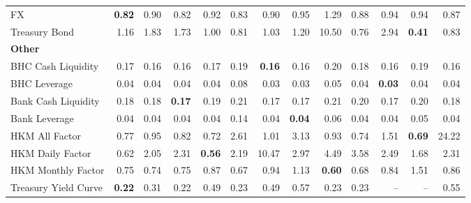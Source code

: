 \begin{tabular}{@{}lrrrrrrrrrrrr@{}}
FX & \textbf{0.82} & 0.90 & 0.82 & 0.92 & 0.83 & 0.90 & 0.95 & 1.29 & 0.88 & 0.94 & 0.94 & 0.87 \\
Treasury Bond & 1.16 & 1.83 & 1.73 & 1.00 & 0.81 & 1.03 & 1.20 & 10.50 & 0.76 & 2.94 & \textbf{0.41} & 0.83 \\
\midrule
\multicolumn{13}{l}{\textbf{Other}} \\
BHC Cash Liquidity & 0.17 & 0.16 & 0.16 & 0.17 & 0.19 & \textbf{0.16} & 0.16 & 0.20 & 0.18 & 0.16 & 0.19 & 0.16 \\
BHC Leverage & 0.04 & 0.04 & 0.04 & 0.04 & 0.08 & 0.03 & 0.03 & 0.05 & 0.04 & \textbf{0.03} & 0.04 & 0.04 \\
Bank Cash Liquidity & 0.18 & 0.18 & \textbf{0.17} & 0.19 & 0.21 & 0.17 & 0.17 & 0.21 & 0.20 & 0.17 & 0.20 & 0.18 \\
Bank Leverage & 0.04 & 0.04 & 0.04 & 0.04 & 0.14 & 0.04 & \textbf{0.04} & 0.06 & 0.04 & 0.04 & 0.05 & 0.04 \\
HKM All Factor & 0.77 & 0.95 & 0.82 & 0.72 & 2.61 & 1.01 & 3.13 & 0.93 & 0.74 & 1.51 & \textbf{0.69} & 24.22 \\
HKM Daily Factor & 0.62 & 2.05 & 2.31 & \textbf{0.56} & 2.19 & 10.47 & 2.97 & 4.49 & 3.58 & 2.49 & 1.68 & 2.31 \\
HKM Monthly Factor & 0.75 & 0.74 & 0.75 & 0.87 & 0.67 & 0.94 & 1.13 & \textbf{0.60} & 0.68 & 0.84 & 1.51 & 0.86 \\
Treasury Yield Curve & \textbf{0.22} & 0.31 & 0.22 & 0.49 & 0.23 & 0.49 & 0.57 & 0.23 & 0.23 & -- & -- & 0.55 \\
\bottomrule
\end{tabular}